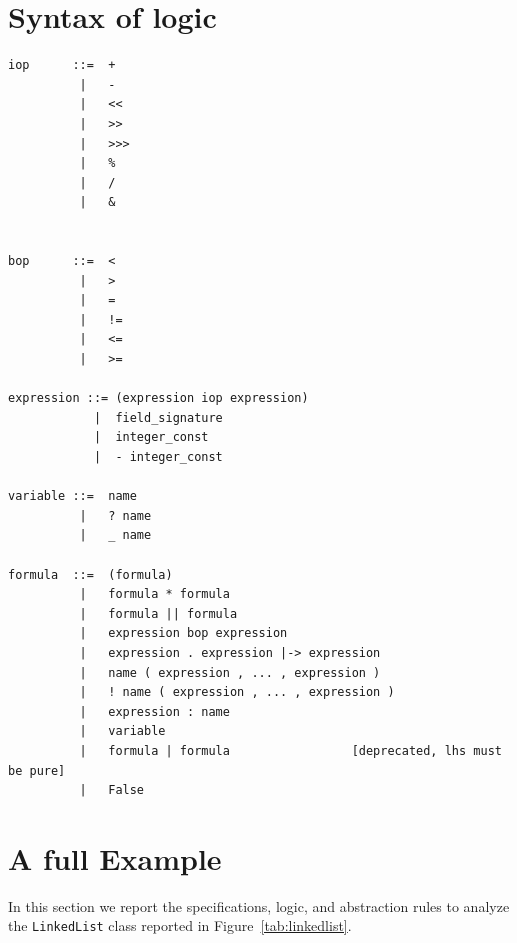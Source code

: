 \documentclass[11pt]{article}
\begin{document}



\appendix 
\section{Syntax of logic}

\begin{verbatim}
iop      ::=  +
          |   -
          |   <<
          |   >>
          |   >>>
          |   %
          |   /
          |   &


bop      ::=  <  
          |   >
          |   =
          |   !=
          |   <=
          |   >=

expression ::= (expression iop expression)
            |  field_signature
            |  integer_const
            |  - integer_const
              
variable ::=  name
          |   ? name
          |   _ name

formula  ::=  (formula)
          |   formula * formula
          |   formula || formula
          |   expression bop expression
          |   expression . expression |-> expression
          |   name ( expression , ... , expression ) 
          |   ! name ( expression , ... , expression ) 
          |   expression : name
          |   variable
          |   formula | formula                 [deprecated, lhs must be pure]
          |   False
\end{verbatim}

\section{A full Example}
In this section we report the specifications, logic, and abstraction rules to analyze the {\tt LinkedList} class
 reported in Figure~\ref{tab:linkedlist}.
\end{document}
